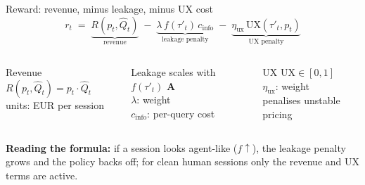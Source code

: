 \documentclass[aspectratio=169,11pt]{beamer}
\newcommand{\roboticon}{\textcolor{PhantomCyan}{\textbf{\textsf{A}}}\xspace}
\begin{document}
\begin{frame}{Reward: revenue, minus leakage, minus UX cost}
  \[
    r_t \;=\; \underbrace{R(p_t,\hat Q_t)}_{\text{revenue}}
          \;-\; \underbrace{\lambda \, f(\tau'_t)\, c_{\text{info}}}_{\text{leakage penalty}}
          \;-\; \underbrace{\eta_{\text{ux}}\, \mathrm{UX}(\tau'_t,p_t)}_{\text{UX penalty}}
  \]

  \vspace{0.6em}
  \begin{columns}[T,onlytextwidth]
    \begin{block}{Revenue}
      \(R(p_t,\hat Q_t) = p_t \cdot \hat Q_t\)\\[0.2em]
      {\footnotesize units: EUR per session}
    \end{block}
    \begin{alertblock}{Leakage}
      scales with $f(\tau'_t)$ \roboticon\\
      $\lambda$: weight\\
      $c_{\text{info}}$: per-query cost
    \end{alertblock}
    \begin{exampleblock}{UX}
      $\mathrm{UX}\in[0,1]$\\
      $\eta_{\text{ux}}$: weight\\
      penalises unstable pricing
    \end{exampleblock}
  \end{columns}

  \vspace{0.4em}
  {\footnotesize \textbf{Reading the formula:}
  if a session looks agent-like ($f \uparrow$), the leakage penalty grows
  and the policy backs off; for clean human sessions only the revenue and
  UX terms are active.}
\end{frame}
\end{document}
